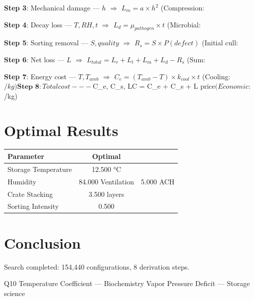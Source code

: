 \documentclass[11pt,twocolumn]{article}
\begin{document}
\textbf{Step 3}: Mechanical damage --- $h$ $\Rightarrow$ $L_m = a \times h^2$ (Compression: %


\textbf{Step 4}: Decay loss --- $T, RH, t$ $\Rightarrow$ $L_d = \mu_{pathogen} \times t$ (Microbial: %


\textbf{Step 5}: Sorting removal --- $S, quality$ $\Rightarrow$ $R_s = S \times P(defect)$ (Initial cull: %


\textbf{Step 6}: Net loss --- $L$ $\Rightarrow$ $L_{total} = L_r + L_t + L_m + L_d - R_s$ (Sum: %


\textbf{Step 7}: Energy cost --- $T, T_{amb}$ $\Rightarrow$ $C_e = (T_{amb}-T) \times k_{cool} \times t$ (Cooling: $/kg)


\textbf{Step 8}: Total cost --- $C_e, C_s, L$ $\Rightarrow$ $C = C_e + C_s + L \times price$ (Economic: $/kg)


\section{Optimal Results}
\begin{table}[h]
\centering
\begin{tabular}{@{}lc@{}}
\toprule
Parameter & Optimal \\
\midrule
Storage Temperature & 12.500 °C \\
Humidity & 84.000 %
Ventilation & 5.000 ACH \\
Crate Stacking & 3.500 layers \\
Sorting Intensity & 0.500  \\
\bottomrule
\end{tabular}
\end{table}

\section{Conclusion}
Search completed: 154,440 configurations, 8 derivation steps.

\begin{thebibliography}{9}
 Q10 Temperature Coefficient --- Biochemistry
 Vapor Pressure Deficit --- Storage science
\end{thebibliography}
\end{document}
